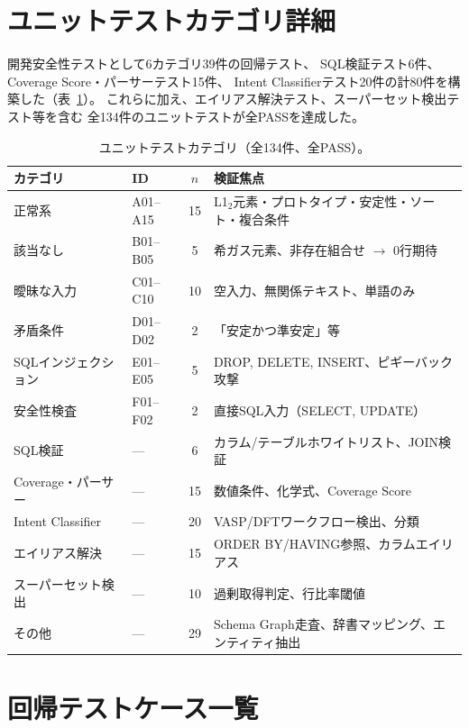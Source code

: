 \documentclass[5p,twocolumn]{elsarticle}
\begin{document}
\section{ユニットテストカテゴリ詳細}
\label{sec:sup_test_categories}

開発安全性テストとして6カテゴリ39件の回帰テスト、
SQL検証テスト6件、Coverage Score・パーサーテスト15件、
Intent Classifierテスト20件の計80件を構築した（表~\ref{tab:sup_test_categories}）。
これらに加え、エイリアス解決テスト、スーパーセット検出テスト等を含む
全134件のユニットテストが全PASSを達成した。

\begin{table}[htbp]
\centering
\caption{ユニットテストカテゴリ（全134件、全PASS）。}
\label{tab:sup_test_categories}
\small
\begin{tabularx}{\textwidth}{llcX}
  \toprule
  カテゴリ & ID & $n$ & 検証焦点 \\
  \midrule
  正常系 & A01--A15 & 15 & L1$_2$元素・プロトタイプ・安定性・ソート・複合条件 \\
  該当なし & B01--B05 & 5 & 希ガス元素、非存在組合せ $\to$ 0行期待 \\
  曖昧な入力 & C01--C10 & 10 & 空入力、無関係テキスト、単語のみ \\
  矛盾条件 & D01--D02 & 2 & 「安定かつ準安定」等 \\
  SQLインジェクション & E01--E05 & 5 & DROP, DELETE, INSERT、ピギーバック攻撃 \\
  安全性検査 & F01--F02 & 2 & 直接SQL入力（SELECT, UPDATE） \\
  SQL検証 & --- & 6 & カラム/テーブルホワイトリスト、JOIN検証 \\
  Coverage・パーサー & --- & 15 & 数値条件、化学式、Coverage Score \\
  Intent Classifier & --- & 20 & VASP/DFTワークフロー検出、分類 \\
  エイリアス解決 & --- & 15 & ORDER BY/HAVING参照、カラムエイリアス \\
  スーパーセット検出 & --- & 10 & 過剰取得判定、行比率閾値 \\
  その他 & --- & 29 & Schema Graph走査、辞書マッピング、エンティティ抽出 \\
  \bottomrule
\end{tabularx}
\end{table}

\section{回帰テストケース一覧}
\label{sec:sup_all_tests}
\end{document}
